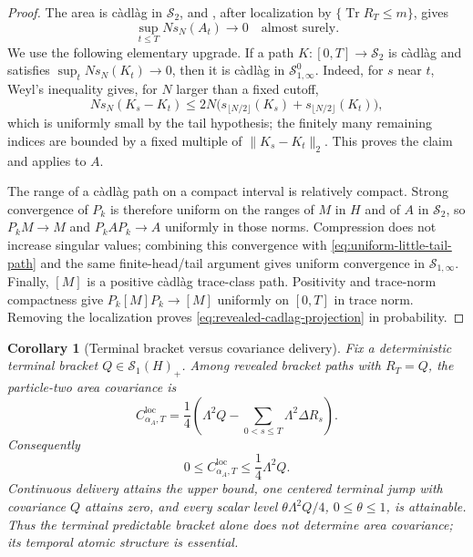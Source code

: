 \documentclass[10pt,reqno]{amsart}
\theoremstyle{plain}
\newtheorem{corollary}[theorem]{Corollary}
\theoremstyle{definition}
\theoremstyle{remark}
\begin{document}
\begin{proof}
The area is c\`adl\`ag in $\mathcal S_2$, and
, after localization by
$\{\operatorname{Tr}R_T\le m\}$, gives
\begin{equation}
 \sup_{t\le T}N s_N(A_t)\longrightarrow0
 \quad\text{almost surely}.
 \label{eq:uniform-little-tail-path}
\end{equation}
We use the following elementary upgrade.  If a path $K:[0,T]\to\mathcal S_2$
is c\`adl\`ag and satisfies
$\sup_tNs_N(K_t)\to0$, then it is c\`adl\`ag in
$\mathcal S^0_{1,\infty}$.  Indeed, for $s$ near $t$, Weyl's inequality gives,
for $N$ larger than a fixed cutoff,
\[
 N s_N(K_s-K_t)
 \leq 2N\bigl(s_{\lfloor N/2\rfloor}(K_s)
                 +s_{\lfloor N/2\rfloor}(K_t)\bigr),
\]
which is uniformly small by the tail hypothesis; the finitely many remaining
indices are bounded by a fixed multiple of $\|K_s-K_t\|_2$.  This proves the
claim and applies to $A$.

The range of a c\`adl\`ag path on a compact interval is relatively compact.
Strong convergence of $P_k$ is therefore uniform on the ranges of $M$ in $H$
and of $A$ in $\mathcal S_2$, so
$P_kM\to M$ and $P_kAP_k\to A$ uniformly in those norms.  Compression does not
increase singular values; combining this convergence with
\eqref{eq:uniform-little-tail-path} and the same finite-head/tail argument gives
uniform convergence in $\mathcal S_{1,\infty}$.  Finally, $[M]$ is a positive
c\`adl\`ag trace-class path.  Positivity and trace-norm compactness give
$P_k[M]P_k\to[M]$ uniformly on $[0,T]$ in trace norm.  Removing the
localization proves \eqref{eq:revealed-cadlag-projection} in probability.
\end{proof}

\begin{corollary}[Terminal bracket versus covariance delivery]
\label{cor:terminal-bracket-delivery}
Fix a deterministic terminal bracket $Q\in\mathcal S_1(H)_+$.  Among
revealed bracket paths with $R_T=Q$, the particle-two area covariance is
\begin{equation}
 C_{\alpha_A,T}^{\mathrm{loc}}
 =\frac14\left(\Lambda^2Q-
   \sum_{0<s\le T}\Lambda^2\Delta R_s\right).
 \label{eq:terminal-bracket-delivery}
\end{equation}
Consequently
\[
 0\le C_{\alpha_A,T}^{\mathrm{loc}}\le\frac14\Lambda^2Q.
\]
Continuous delivery attains the upper bound, one centered terminal jump with
covariance $Q$ attains zero, and every scalar level
$\theta\Lambda^2Q/4$, $0\le\theta\le1$, is attainable.  Thus the terminal
predictable bracket alone does not determine area covariance; its temporal
atomic structure is essential.
\end{corollary}
\end{document}
